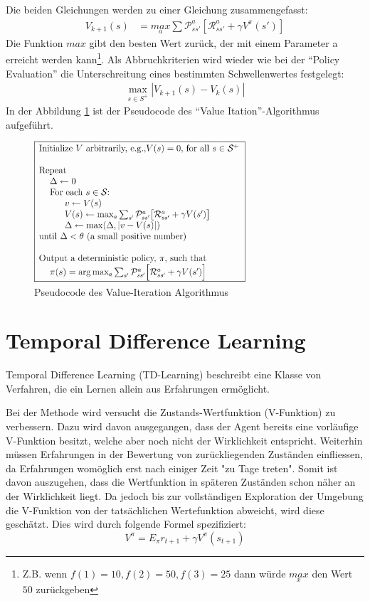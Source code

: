 \documentclass[10pt]{scrartcl}
\begin{document}
Die beiden Gleichungen werden zu einer Gleichung zusammengefasst:
\begin{align}
V_{k+1}(s) &= \underset{a}{max}\sum\mathcal{P}^a_{ss'}[\mathcal{R}^a_{ss'}+\gamma V^\pi(s')]
\end{align}
Die Funktion $max$ gibt den besten Wert zurück, der mit einem Parameter a erreicht werden kann\footnote{Z.B. wenn $f(1)=10, f(2)=50, f(3) = 25$ dann würde $\underset{x}{max}$ den Wert $50$ zurückgeben}. Als Abbruchkriterien wird wieder wie bei der ``Policy Evaluation'' die Unterschreitung eines bestimmten Schwellenwertes festgelegt: 
\begin{align}
\max\limits_{s\in S^+} |V_{k+1}(s)-V_k(s)|
\end{align}
In der Abbildung \ref{fig:valueiteration} ist der Pseudocode des ``Value Itation''-Algorithmus aufgeführt.
\begin{figure}[htc]
    \centering
    \includegraphics[width=0.7\textwidth]{Grafiken/24vi.png}
    \caption{Pseudocode des Value-Iteration Algorithmus}
    \label{fig:valueiteration}
\end{figure}

\section{Temporal Difference Learning}
Temporal Difference Learning (TD-Learning) beschreibt eine Klasse von Verfahren, die ein Lernen allein aus Erfahrungen ermöglicht. 

Bei der Methode wird versucht die Zustands-Wertfunktion (V-Funktion) zu verbessern. Dazu wird davon ausgegangen, dass der Agent bereits eine vorläufige V-Funktion besitzt, welche aber noch nicht der Wirklichkeit entspricht. Weiterhin müssen Erfahrungen in der Bewertung von zurückliegenden Zuständen einfliessen, da Erfahrungen womöglich erst nach einiger Zeit "zu Tage treten". Somit ist davon auszugehen, dass die Wertfunktion in späteren Zuständen schon näher an der Wirklichkeit liegt. Da jedoch bis zur vollständigen Exploration der Umgebung die V-Funktion von der tatsächlichen Wertefunktion abweicht, wird diese geschätzt.
Dies wird durch folgende Formel spezifiziert:
\begin{equation}
V^\pi = E_\pi{r_{t+1}+\gamma V^ \pi(s_{t+1})}
\end{equation}
\end{document}
